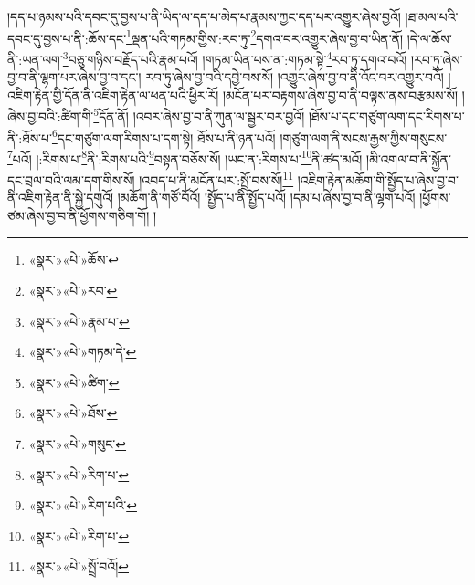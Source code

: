 །དད་པ་ཉམས་པའི་དབང་དུ་བྱས་པ་ནི་ཡིད་ལ་དད་པ་མེད་པ་རྣམས་ཀྱང་དད་པར་འགྱུར་ཞེས་བྱའོ། །ཐ་མལ་པའི་དབང་དུ་བྱས་པ་ནི་:ཆོས་དང་\footnote{«སྣར་»«པེ་»ཆོས་}ལྡན་པའི་གཏམ་གྱིས་:རབ་ཏུ་\footnote{«སྣར་»«པེ་»རབ་}དགའ་བར་འགྱུར་ཞེས་བྱ་བ་ཡིན་ནོ། །དེ་ལ་ཆོས་ནི་:ཡན་ལག་\footnote{«སྣར་»«པེ་»རྣམ་པ་}བཅུ་གཉིས་བརྗོད་པའི་རྣམ་པའོ། །གཏམ་ཡིན་པས་ན་:གཏམ་སྟེ་\footnote{«སྣར་»«པེ་»གཏམ་དེ་}རབ་ཏུ་དགའ་བའོ། །རབ་ཏུ་ཞེས་བྱ་བ་ནི་ལྷག་པར་ཞེས་བྱ་བ་དང་། རབ་ཏུ་ཞེས་བྱ་བའི་དབྱེ་བས་སོ། །འགྱུར་ཞེས་བྱ་བ་ནི་འོང་བར་འགྱུར་བའོ། །འཇིག་རྟེན་གྱི་དོན་ནི་འཇིག་རྟེན་ལ་ཕན་པའི་ཕྱིར་རོ། །མངོན་པར་བརྟགས་ཞེས་བྱ་བ་ནི་བལྟས་ནས་བརྩམས་སོ། །ཞེས་བྱ་བའི་:ཚིག་གི་\footnote{«སྣར་»«པེ་»ཚིག་}དོན་ནོ། །འབར་ཞེས་བྱ་བ་ནི་ཀུན་ལ་སྦྱར་བར་བྱའོ། །ཐོས་པ་དང་གཙུག་ལག་དང་རིགས་པ་ནི་:ཐོས་པ་\footnote{«སྣར་»«པེ་»ཐོས་}དང་གཙུག་ལག་རིགས་པ་དག་སྟེ། ཐོས་པ་ནི་ཉན་པའོ། །གཙུག་ལག་ནི་སངས་རྒྱས་ཀྱིས་གསུངས་\footnote{«སྣར་»«པེ་»གསུང་}པའོ། །:རིགས་པ་\footnote{«སྣར་»«པེ་»རིག་པ་}ནི་:རིགས་པའི་\footnote{«སྣར་»«པེ་»རིག་པའི་}བསྟན་བཅོས་སོ། །ཡང་ན་:རིགས་པ་\footnote{«སྣར་»«པེ་»རིག་པ་}ནི་ཚད་མའོ། །མི་འགལ་བ་ནི་སྐྱོན་དང་བྲལ་བའི་ལམ་དག་གིས་སོ། །འབད་པ་ནི་མངོན་པར་:སྤྲོ་བས་སོ།\footnote{«སྣར་»«པེ་»སྤྲོ་བའོ།} །འཇིག་རྟེན་མཆོག་གི་སྤྱོད་པ་ཞེས་བྱ་བ་ནི་འཇིག་རྟེན་ནི་སྐྱེ་དགུའོ། །མཆོག་ནི་གཙོ་བོའོ། །སྤྱོད་པ་ནི་སྤྱོད་པའོ། །དམ་པ་ཞེས་བྱ་བ་ནི་ལྷག་པའོ། །ཕྱོགས་ཙམ་ཞེས་བྱ་བ་ནི་ཕྱོགས་གཅིག་གོ། །
